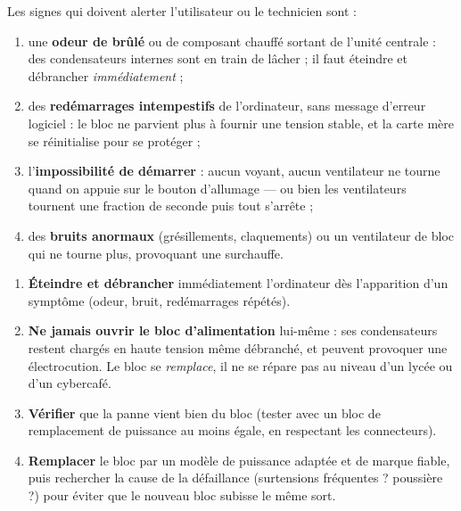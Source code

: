 \documentclass[11pt]{article}
\begin{document}
\begin{propriete}
Les signes qui doivent alerter l'utilisateur ou le technicien sont :
\begin{enumerate}
\item une \textbf{odeur de brûlé} ou de composant chauffé sortant de l'unité centrale : des condensateurs internes sont en train de lâcher ; il faut éteindre et débrancher \emph{immédiatement} ;
\item des \textbf{redémarrages intempestifs} de l'ordinateur, sans message d'erreur logiciel : le bloc ne parvient plus à fournir une tension stable, et la carte mère se réinitialise pour se protéger ;
\item l'\textbf{impossibilité de démarrer} : aucun voyant, aucun ventilateur ne tourne quand on appuie sur le bouton d'allumage — ou bien les ventilateurs tournent une fraction de seconde puis tout s'arrête ;
\item des \textbf{bruits anormaux} (grésillements, claquements) ou un ventilateur de bloc qui ne tourne plus, provoquant une surchauffe.
\end{enumerate}
\end{propriete}

\begin{methode}
\begin{enumerate}
\item \textbf{Éteindre et débrancher} immédiatement l'ordinateur dès l'apparition d'un symptôme (odeur, bruit, redémarrages répétés).
\item \textbf{Ne jamais ouvrir le bloc d'alimentation} lui-même : ses condensateurs restent chargés en haute tension même débranché, et peuvent provoquer une électrocution. Le bloc se \emph{remplace}, il ne se répare pas au niveau d'un lycée ou d'un cybercafé.
\item \textbf{Vérifier} que la panne vient bien du bloc (tester avec un bloc de remplacement de puissance au moins égale, en respectant les connecteurs).
\item \textbf{Remplacer} le bloc par un modèle de puissance adaptée et de marque fiable, puis rechercher la cause de la défaillance (surtensions fréquentes ? poussière ?) pour éviter que le nouveau bloc subisse le même sort.
\end{enumerate}
\end{methode}
\end{document}
